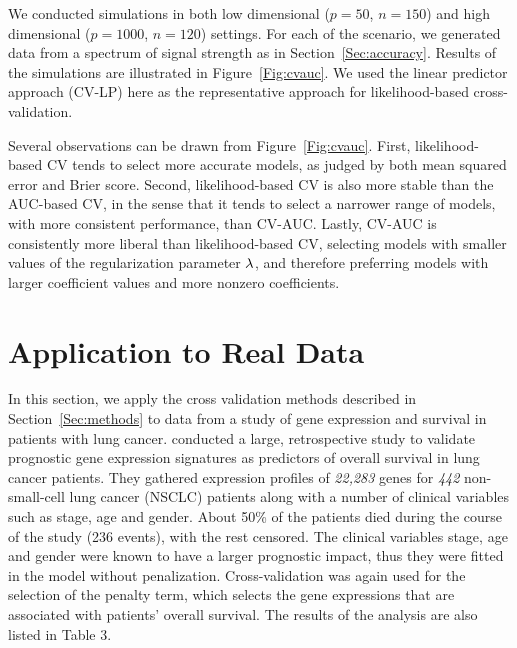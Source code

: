 \par We conducted simulations in both low dimensional ($p = 50$, $n = 150$) and high dimensional ($p = 1000$, $n = 120$) settings. For each of the scenario, we generated data from a spectrum of signal strength as in Section~\ref{Sec:accuracy}. Results of the simulations are illustrated in Figure~\ref{Fig:cvauc}.  We used the linear predictor approach (CV-LP) here as the representative approach for likelihood-based cross-validation.

Several observations can be drawn from Figure~\ref{Fig:cvauc}. First, likelihood-based CV tends to select more accurate models, as judged by both mean squared error and Brier score.  Second, likelihood-based CV is also more stable than the AUC-based CV, in the sense that it tends to select a narrower range of models, with more consistent performance, than CV-AUC.  Lastly, CV-AUC is consistently more liberal than likelihood-based CV, selecting models with smaller values of the regularization parameter $\lambda$, and therefore preferring models with larger coefficient values and more nonzero coefficients.


\section{Application to Real Data}

\par In this section, we apply the cross validation methods described in Section~\ref{Sec:methods} to data from a study of gene expression and survival in patients with lung cancer. \citet{shedden2008gene} conducted a large, retrospective study to validate prognostic gene expression signatures as predictors of overall survival in lung cancer patients.
They gathered expression profiles of \textit{22,283} genes for \textit{442}  non-small-cell lung cancer (NSCLC) patients along with a number of clinical variables such as stage, age and gender.  About 50\% of the patients died during the course of the study (236 events), with the rest censored. The clinical variables stage, age and gender were known to have a larger prognostic impact, thus they were fitted in the model without penalization. Cross-validation was again used for the selection of the penalty term, which selects the gene expressions that are associated with patients' overall survival. The results of the analysis are also listed in Table 3.


